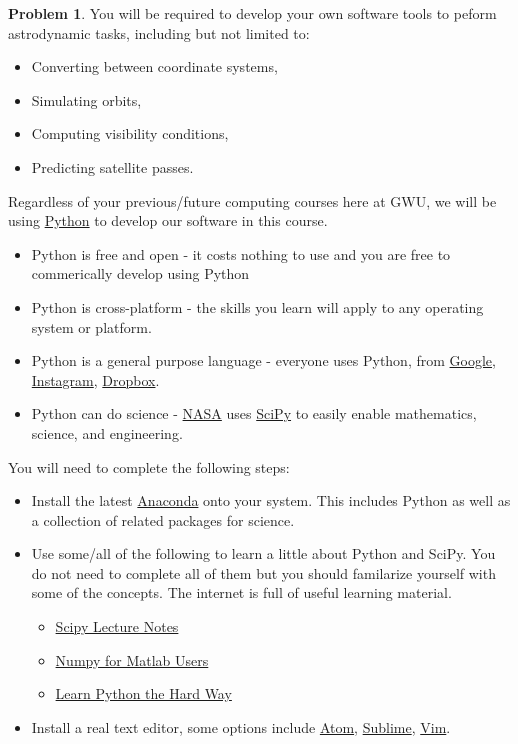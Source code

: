 \documentclass[10pt]{article}
\theoremstyle{definition}
\newtheorem{prob}{Problem}[section]
\begin{document}
\begin{prob}
You will be required to develop your own software tools to peform astrodynamic tasks, including but not limited to:
\begin{itemize}
    \item Converting between coordinate systems,
    \item Simulating orbits,
    \item Computing visibility conditions,
    \item Predicting satellite passes.
\end{itemize} 
Regardless of your previous/future computing courses here at GWU, we will be using \href{https://www.python.org/}{Python} to develop our software in this course.
\begin{itemize}
    \item Python is free and open - it costs nothing to use and you are free to commerically develop using Python
    \item Python is cross-platform - the skills you learn will apply to any operating system or platform. 
    \item Python is a general purpose language - everyone uses Python, from \href{https://www.tensorflow.org/}{Google}, \href{https://engineering.instagram.com/web-service-efficiency-at-instagram-with-python-4976d078e366}{Instagram}, \href{https://github.com/dropbox/dropbox-sdk-python}{Dropbox}.
    \item Python can do science - \href{https://www.python.org/about/success/usa/}{NASA} uses \href{https://www.scipy.org/}{SciPy} to easily enable mathematics, science, and engineering.
\end{itemize}
You will need to complete the following steps: 
\begin{itemize}
    \item Install the latest \href{https://www.continuum.io/downloads}{Anaconda} onto your system. 
        This includes Python as well as a collection of related packages for science. 
    \item Use some/all of the following to learn a little about Python and SciPy.
        You do not need to complete all of them but you should familarize yourself with some of the concepts. 
        The internet is full of useful learning material.
        \begin{itemize}
            \item \href{http://www.scipy-lectures.org/}{Scipy Lecture Notes}
            \item \href{https://docs.scipy.org/doc/numpy-dev/user/numpy-for-matlab-users.html}{Numpy for Matlab Users}
            \item \href{https://learnpythonthehardway.org/book/}{Learn Python the Hard Way}
        \end{itemize}
    \item Install a real text editor, some options include \href{https://atom.io/}{Atom}, \href{https://www.sublimetext.com/}{Sublime}, \href{http://www.vim.org/download.php}{Vim}.
\end{itemize}

\end{prob}
\end{document}
